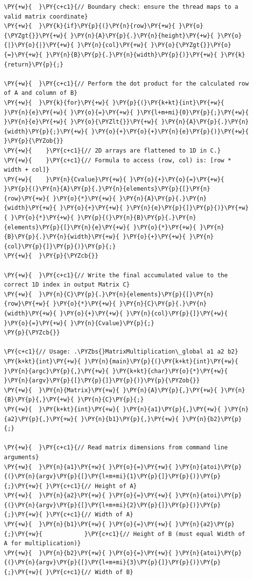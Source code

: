 \begin{Verbatim}[label=\makebox{\url{https://github.com/lucabaldini/cmepda/tree/master/slides/latex/snippets/MatrixMultiplication_global.cu}},commandchars=\\\{\}]
\PY{+w}{  }\PY{c+c1}{// Boundary check: ensure the thread maps to a valid matrix coordinate}
\PY{+w}{  }\PY{k}{if}\PY{p}{(}\PY{n}{row}\PY{+w}{ }\PY{o}{\PYZgt{}}\PY{+w}{ }\PY{n}{A}\PY{p}{.}\PY{n}{height}\PY{+w}{ }\PY{o}{|}\PY{o}{|}\PY{+w}{ }\PY{n}{col}\PY{+w}{ }\PY{o}{\PYZgt{}}\PY{o}{=}\PY{+w}{ }\PY{n}{B}\PY{p}{.}\PY{n}{width}\PY{p}{)}\PY{+w}{ }\PY{k}{return}\PY{p}{;}

\PY{+w}{  }\PY{c+c1}{// Perform the dot product for the calculated row of A and column of B}
\PY{+w}{  }\PY{k}{for}\PY{+w}{ }\PY{p}{(}\PY{k+kt}{int}\PY{+w}{ }\PY{n}{e}\PY{+w}{ }\PY{o}{=}\PY{+w}{ }\PY{l+m+mi}{0}\PY{p}{;}\PY{+w}{ }\PY{n}{e}\PY{+w}{ }\PY{o}{\PYZlt{}}\PY{+w}{ }\PY{n}{A}\PY{p}{.}\PY{n}{width}\PY{p}{;}\PY{+w}{ }\PY{o}{+}\PY{o}{+}\PY{n}{e}\PY{p}{)}\PY{+w}{ }\PY{p}{\PYZob{}}
\PY{+w}{    }\PY{c+c1}{// 2D arrays are flattened to 1D in C.}
\PY{+w}{    }\PY{c+c1}{// Formula to access (row, col) is: [row * width + col]}
\PY{+w}{    }\PY{n}{Cvalue}\PY{+w}{ }\PY{o}{+}\PY{o}{=}\PY{+w}{ }\PY{p}{(}\PY{n}{A}\PY{p}{.}\PY{n}{elements}\PY{p}{[}\PY{n}{row}\PY{+w}{ }\PY{o}{*}\PY{+w}{ }\PY{n}{A}\PY{p}{.}\PY{n}{width}\PY{+w}{ }\PY{o}{+}\PY{+w}{ }\PY{n}{e}\PY{p}{]}\PY{p}{)}\PY{+w}{ }\PY{o}{*}\PY{+w}{ }\PY{p}{(}\PY{n}{B}\PY{p}{.}\PY{n}{elements}\PY{p}{[}\PY{n}{e}\PY{+w}{ }\PY{o}{*}\PY{+w}{ }\PY{n}{B}\PY{p}{.}\PY{n}{width}\PY{+w}{ }\PY{o}{+}\PY{+w}{ }\PY{n}{col}\PY{p}{]}\PY{p}{)}\PY{p}{;}
\PY{+w}{  }\PY{p}{\PYZcb{}}

\PY{+w}{  }\PY{c+c1}{// Write the final accumulated value to the correct 1D index in output Matrix C}
\PY{+w}{  }\PY{n}{C}\PY{p}{.}\PY{n}{elements}\PY{p}{[}\PY{n}{row}\PY{+w}{ }\PY{o}{*}\PY{+w}{ }\PY{n}{C}\PY{p}{.}\PY{n}{width}\PY{+w}{ }\PY{o}{+}\PY{+w}{ }\PY{n}{col}\PY{p}{]}\PY{+w}{ }\PY{o}{=}\PY{+w}{ }\PY{n}{Cvalue}\PY{p}{;}
\PY{p}{\PYZcb{}}

\PY{c+c1}{// Usage: .\PYZbs{}MatrixMultiplication\_global a1 a2 b2}
\PY{k+kt}{int}\PY{+w}{ }\PY{n}{main}\PY{p}{(}\PY{k+kt}{int}\PY{+w}{ }\PY{n}{argc}\PY{p}{,}\PY{+w}{ }\PY{k+kt}{char}\PY{o}{*}\PY{+w}{ }\PY{n}{argv}\PY{p}{[}\PY{p}{]}\PY{p}{)}\PY{p}{\PYZob{}}
\PY{+w}{  }\PY{n}{Matrix}\PY{+w}{ }\PY{n}{A}\PY{p}{,}\PY{+w}{ }\PY{n}{B}\PY{p}{,}\PY{+w}{ }\PY{n}{C}\PY{p}{;}
\PY{+w}{  }\PY{k+kt}{int}\PY{+w}{ }\PY{n}{a1}\PY{p}{,}\PY{+w}{ }\PY{n}{a2}\PY{p}{,}\PY{+w}{ }\PY{n}{b1}\PY{p}{,}\PY{+w}{ }\PY{n}{b2}\PY{p}{;}

\PY{+w}{  }\PY{c+c1}{// Read matrix dimensions from command line arguments}
\PY{+w}{  }\PY{n}{a1}\PY{+w}{ }\PY{o}{=}\PY{+w}{ }\PY{n}{atoi}\PY{p}{(}\PY{n}{argv}\PY{p}{[}\PY{l+m+mi}{1}\PY{p}{]}\PY{p}{)}\PY{p}{;}\PY{+w}{ }\PY{c+c1}{// Height of A}
\PY{+w}{  }\PY{n}{a2}\PY{+w}{ }\PY{o}{=}\PY{+w}{ }\PY{n}{atoi}\PY{p}{(}\PY{n}{argv}\PY{p}{[}\PY{l+m+mi}{2}\PY{p}{]}\PY{p}{)}\PY{p}{;}\PY{+w}{ }\PY{c+c1}{// Width of A}
\PY{+w}{  }\PY{n}{b1}\PY{+w}{ }\PY{o}{=}\PY{+w}{ }\PY{n}{a2}\PY{p}{;}\PY{+w}{            }\PY{c+c1}{// Height of B (must equal Width of A for multiplication)}
\PY{+w}{  }\PY{n}{b2}\PY{+w}{ }\PY{o}{=}\PY{+w}{ }\PY{n}{atoi}\PY{p}{(}\PY{n}{argv}\PY{p}{[}\PY{l+m+mi}{3}\PY{p}{]}\PY{p}{)}\PY{p}{;}\PY{+w}{ }\PY{c+c1}{// Width of B}


\end{Verbatim}
